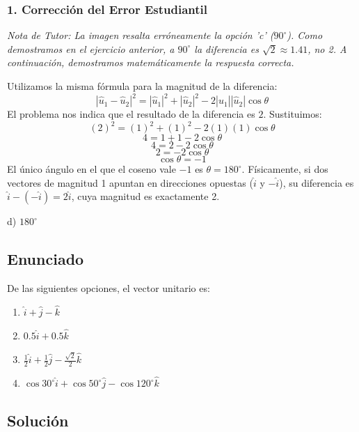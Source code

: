 \documentclass[12pt, a4paper]{article}
\begin{document}
\subsubsection*{1. Corrección del Error Estudiantil}
\textit{Nota de Tutor: La imagen resalta erróneamente la opción 'c' ($90^\circ$). Como demostramos en el ejercicio anterior, a $90^\circ$ la diferencia es $\sqrt{2} \approx 1.41$, no 2. A continuación, demostramos matemáticamente la respuesta correcta.}

Utilizamos la misma fórmula para la magnitud de la diferencia:
$$ |\hat{u}_1 - \hat{u}_2|^2 = |\hat{u}_1|^2 + |\hat{u}_2|^2 - 2|\hat{u}_1||\hat{u}_2| \cos\theta $$
El problema nos indica que el resultado de la diferencia es $2$. Sustituimos:
$$ (2)^2 = (1)^2 + (1)^2 - 2(1)(1)\cos\theta $$
$$ 4 = 1 + 1 - 2\cos\theta $$
$$ 4 = 2 - 2\cos\theta $$
$$ 2 = -2\cos\theta $$
$$ \cos\theta = -1 $$
El único ángulo en el que el coseno vale $-1$ es \textbf{$\theta = 180^\circ$}. Físicamente, si dos vectores de magnitud 1 apuntan en direcciones opuestas ($\hat{i}$ y $-\hat{i}$), su diferencia es $\hat{i} - (-\hat{i}) = 2\hat{i}$, cuya magnitud es exactamente 2.

\begin{tcolorbox}[colback=green!5!white, colframe=green!50!black, title=Respuesta Final]
\centering \Large d) $180^\circ$
\end{tcolorbox}

\newpage


\subsection*{Enunciado}
De las siguientes opciones, el vector unitario es:
\begin{enumerate}[label=\alph*)]
    \item $\hat{i} + \hat{j} - \hat{k}$
    \item $0.5 \hat{i} + 0.5 \hat{k}$
    \item $\frac{1}{2}\hat{i} + \frac{1}{2}\hat{j} - \frac{\sqrt{2}}{2}\hat{k}$
    \item $\cos 30^\circ \hat{i} + \cos 50^\circ \hat{j} - \cos 120^\circ \hat{k}$
\end{enumerate}

\subsection*{Solución}
\end{document}
